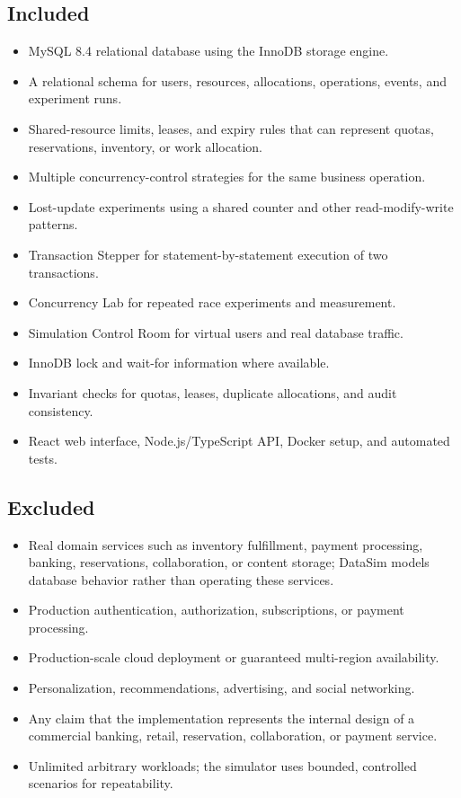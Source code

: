 \documentclass[12pt,a4paper]{article}
\begin{document}
\subsection{Included}
\begin{itemize}
\item MySQL 8.4 relational database using the InnoDB storage engine.
\item A relational schema for users, resources, allocations, operations, events, and experiment runs.
\item Shared-resource limits, leases, and expiry rules that can represent quotas, reservations, inventory, or work allocation.
\item Multiple concurrency-control strategies for the same business operation.
\item Lost-update experiments using a shared counter and other read-modify-write patterns.
\item Transaction Stepper for statement-by-statement execution of two transactions.
\item Concurrency Lab for repeated race experiments and measurement.
\item Simulation Control Room for virtual users and real database traffic.
\item InnoDB lock and wait-for information where available.
\item Invariant checks for quotas, leases, duplicate allocations, and audit consistency.
\item React web interface, Node.js/TypeScript API, Docker setup, and automated tests.
\end{itemize}

\subsection{Excluded}
\begin{itemize}
\item Real domain services such as inventory fulfillment, payment processing, banking, reservations, collaboration, or content storage; DataSim models database behavior rather than operating these services.
\item Production authentication, authorization, subscriptions, or payment processing.
\item Production-scale cloud deployment or guaranteed multi-region availability.
\item Personalization, recommendations, advertising, and social networking.
\item Any claim that the implementation represents the internal design of a commercial banking, retail, reservation, collaboration, or payment service.
\item Unlimited arbitrary workloads; the simulator uses bounded, controlled scenarios for repeatability.
\end{itemize}
\end{document}

